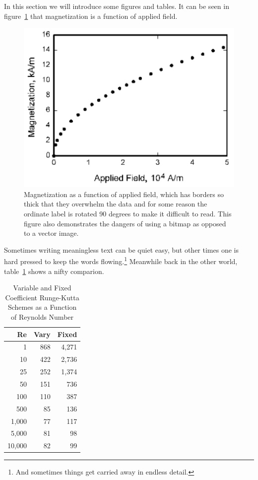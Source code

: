 \documentclass[]{aiaa-tc} %
\begin{document}
In this section we will introduce some figures and tables.
It can be seen in figure~\ref{f:magnetic_field} that magnetization is a
function of applied field.
\begin{figure}[htb]%
 \includegraphics{sample_fig}
 \caption{Magnetization as a function of applied field, which has
   borders so thick that they overwhelm the data and for some reason the
   ordinate label is rotated 90 degrees to make it difficult to
   read. This figure also demonstrates the dangers of using a bitmap
   as opposed to a vector image.}
 \label{f:magnetic_field}
\end{figure}
Sometimes writing meaningless text can be quiet easy, but other times
one is hard pressed to keep the words flowing.\footnote{And sometimes
things get carried away in endless detail.}
Meanwhile back in the other world, table~\ref{t:scheme_comparison} shows
a nifty comparion.
\begin{table}%
 \begin{center}
  \caption{Variable and Fixed Coefficient Runge-Kutta Schemes as a
           Function of Reynolds Number}
  \label{t:scheme_comparison}
  \begin{tabular}{rrr}
       Re & Vary & Fixed \\\hline
        1 &  868 & 4,271 \\
       10 &  422 & 2,736 \\
       25 &  252 & 1,374 \\
       50 &  151 &   736 \\
      100 &  110 &   387 \\
      500 &   85 &   136 \\
    1,000 &   77 &   117 \\
    5,000 &   81 &    98 \\
   10,000 &   82 &    99
  \end{tabular}
 \end{center}
\end{table}
\end{document}
